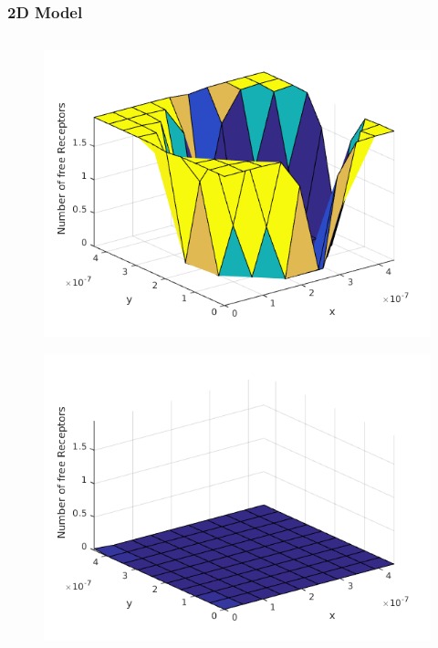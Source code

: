 \documentclass[screen]{beamer}
\begin{document}
\begin{frame}
	\frametitle{2D Model}
%         
%  		
\begin{columns}
    \begin{column}{.5\linewidth}
        \begin{figure}
  		\includegraphics[scale=0.25]{receptordensity5ms}
  		\end{figure}
  		\begin{figure}
  		\includegraphics[scale=0.25]{receptordensity}

\end{figure}
\end{column}
\end{columns}
\end{frame}
\end{document}
